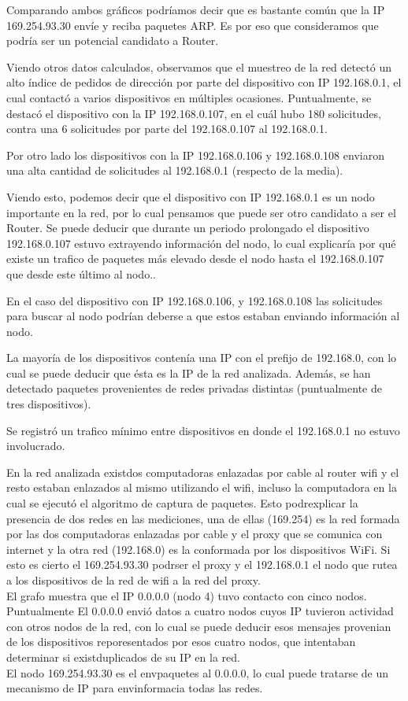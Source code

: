 Comparando ambos gr\'aficos podr\'iamos decir que es bastante com\'un que la IP 169.254.93.30 env\'ie y reciba paquetes ARP. Es por eso que consideramos que podr\'ia ser un potencial candidato a Router.

Viendo otros datos calculados, observamos que el muestreo de la red detect\'o un alto \'indice de pedidos de direcci\'on por parte del dispositivo con IP 192.168.0.1, el cual contact\'o a varios dispositivos en m\'ultiples ocasiones. Puntualmente, se destac\'o el dispositivo con la IP 192.168.0.107, en el cu\'al hubo 180 solicitudes, contra una 6 solicitudes por parte del 192.168.0.107 al 192.168.0.1.

Por otro lado los dispositivos con la IP 192.168.0.106 y 192.168.0.108 enviaron una alta cantidad de solicitudes al  192.168.0.1 (respecto de la media).

Viendo esto, podemos decir que el dispositivo con IP 192.168.0.1 es un nodo importante en la red, por lo cual pensamos que puede ser otro candidato a ser el Router. Se puede deducir que durante un periodo prolongado el dispositivo 192.168.0.107 estuvo extrayendo informaci\'on del nodo, lo cual explicar\'ia por qu\'e existe un trafico de paquetes m\'as elevado desde el nodo hasta el  192.168.0.107 que desde este \'ultimo al nodo..

En el caso del dispositivo con IP 192.168.0.106, y 192.168.0.108 las solicitudes para buscar al nodo podr\'ian deberse a que estos estaban enviando informaci\'on al nodo.

La mayor\'ia de los dispositivos conten\'ia una IP con el prefijo de 192.168.0, con lo cual se puede deducir que \'esta es la IP de la red analizada. Adem\'as, se han detectado paquetes provenientes de redes privadas distintas (puntualmente de tres dispositivos).

Se registr\'o un trafico m\'inimo entre dispositivos en donde el 192.168.0.1 no estuvo involucrado.

En la red analizada exist\ian dos computadoras enlazadas por cable al router wifi y el resto estaban enlazados al mismo utilizando el wifi, incluso la computadora en la cual se ejecut\'o el algoritmo de captura de paquetes. Esto podr\ia explicar la presencia de dos redes en las mediciones, una de ellas (169.254) es la red formada por las dos computadoras enlazadas por cable y el proxy que se comunica con internet y la otra red (192.168.0) es la conformada por los dispositivos WiFi. Si esto es cierto el 169.254.93.30 podr\ia ser el proxy y el 192.168.0.1 el nodo que rutea a los dispositivos de la red de wifi a la red del proxy.\\
El grafo muestra que el IP 0.0.0.0 (nodo 4) tuvo contacto con cinco nodos. Puntualmente El 0.0.0.0 envi\'o datos a cuatro nodos cuyos IP tuvieron actividad con otros nodos de la red, con lo cual se puede deducir esos mensajes provenian de los dispositivos reporesentados por esos cuatro nodos, que intentaban determinar si exist\ian duplicados de su IP en la red. \\
El nodo 169.254.93.30 es el \unico env\ia paquetes al 0.0.0.0, lo cual puede tratarse de un mecanismo de IP para env\iar informaci\on a todas las redes.\\

